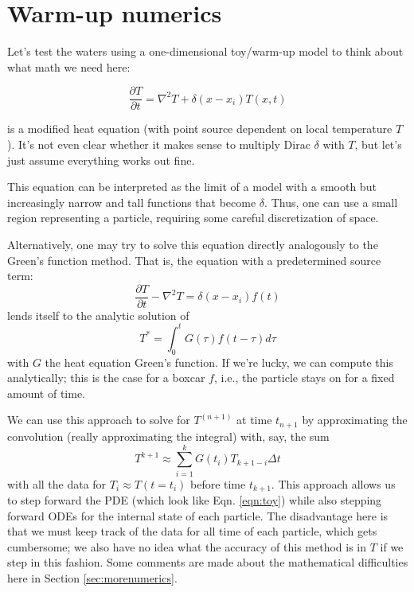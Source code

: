 \documentclass{article}
\begin{document}
\section{Warm-up numerics}

Let's test the waters using a one-dimensional toy/warm-up model to think about what math we need here:

\begin{equation}
    \frac{\partial T}{\partial t} = \nabla^2 T + \delta(x-x_i) T(x,t)
\label{eqn:toy}
\end{equation}

is a modified heat equation (with point source dependent on local temperature $T$). It's not even clear whether it makes sense to multiply Dirac $\delta$ with $T$, but let's just assume everything works out fine.

This equation can be interpreted as the limit of a model with a smooth but increasingly narrow and tall functions that become $\delta$.
Thus, one can use a small region representing a particle, requiring some careful discretization of space.

Alternatively, one may try to solve this equation directly analogously to the Green's function method. That is, the equation with a predetermined source term:
\begin{equation}
    \frac{\partial T}{\partial t} - \nabla^2 T = \delta(x-x_i) f(t)
\end{equation}
lends itself to the analytic solution of
\begin{equation}
    T^* = \int_0^t G(\tau) f(t-\tau) d\tau
\end{equation}
with $G$ the heat equation Green's function. If we're lucky, we can compute this analytically; this is the case for a boxcar $f$, i.e., the particle stays on for a fixed amount of time.

We can use this approach to solve for $T^(n+1)$ at time $t_{n+1}$ by approximating the convolution (really approximating the integral) with, say, the sum
\begin{equation}
    T^{k+1} \approx \sum_{i=1}^{k} G(t_i) T_{k+1-i} \Delta t
\end{equation}
with all the data for $T_i \approx T(t = t_i)$ before time $t_{k+1}$. This approach allows us to step forward the PDE (which look like Eqn. \ref{eqn:toy}) while also stepping forward ODEs for the internal state of each particle. The disadvantage here is that we must keep track of the data for all time of each particle, which gets cumbersome; we also have no idea what the accuracy of this method is in $T$ if we step in this fashion. Some comments are made about the mathematical difficulties here in Section \ref{sec:morenumerics}.
\end{document}
